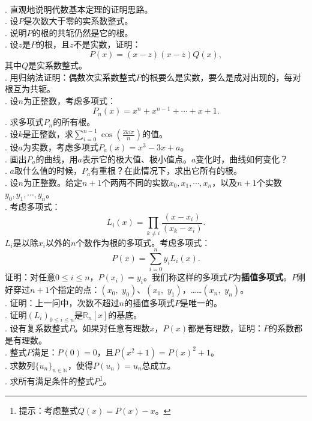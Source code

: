 \documentclass[12pt,UTF8]{ctexbook}
\begin{document}
\begin{appendix}
\begin{xt}
    \mbox{} \\
    . 直观地说明代数基本定理的证明思路。\\
    . 设$P$是次数大于零的实系数整式。\\
    . 说明$P$的根的共轭仍然是它的根。\\
    . 设$z$是$P$的根，且$z$不是实数，证明：
    $$ P(x) = (x - z)(x - \overline{z}) Q(x),$$
    其中$Q$是实系数整式。\\
    . 用归纳法证明：偶数次实系数整式$P$的根要么是实数，要么是成对出现的，每对根互为共轭。\\
    . 设$n$为正整数，考虑多项式：
    $$ P_n(x) = x^n + x^{n-1} + \cdots+ x + 1 . $$
    . 求多项式$P_n$的所有根。\\
    . 设$k$是正整数，求$\sum_{i=0}^{n-1}\cos{\left(\frac{2ki\pi}{n}\right)}$的值。\\
    . 设$a$为实数，考虑多项式$P_a(x) = x^3 - 3x + a$。\\
    . 画出$P_a$的曲线，用$a$表示它的极大值、极小值点。$a$变化时，曲线如何变化？\\
    . $a$取什么值的时候，$P_a$有重根？在此情况下，求出它所有的根。\\
    . 设$n$为正整数。给定$n+1$个两两不同的实数$x_0, x_1, \cdots, x_n$，以及$n+1$个实数$y_0, y_1, \cdots, y_n$。\\
    . 考虑多项式：
    $$ L_i(x) = \prod_{k\neq i}\frac{(x - x_i)}{(x_k - x_i)}.$$
    $L_i$是以除$x_i$以外的$n$个数作为根的多项式。考虑多项式：
    $$ P(x) = \sum_{i=0}^n y_i L_i(x).$$
    证明：对任意$0\leqslant i\leqslant n$，$P(x_i) = y_i$。我们称这样的多项式$P$为\textbf{插值多项式}。$P$刚好穿过$n+1$个指定的点：$(x_0,\,\,y_0)$、$(x_1,\,\,y_1)$，……$(x_n,\,\,y_n)$。\\
    . 证明：上一问中，次数不超过$n$的插值多项式$P$是唯一的。\\
    . 证明$\left(L_i\right)_{0\leqslant i \leqslant n}$是$\mathbb{R}_n[x]$的基底。\\
    . 设有复系数整式$P$。如果对任意有理数$x$，$P(x)$都是有理数，证明：$P$的系数都是有理数。\\
    . 整式$P$满足：$P(0)=0$，且$P(x^2 + 1) = P(x)^2 + 1$。\\
    . 求数列$\{u_n\}_{n\in\mathbb{N}}$，使得$P(u_n) = u_n$总成立。\\
    . 求所有满足条件的整式$P$\footnote{提示：考虑整式$Q(x) = P(x) - x$。}。\\

\end{xt}
\end{appendix}
\end{document}
